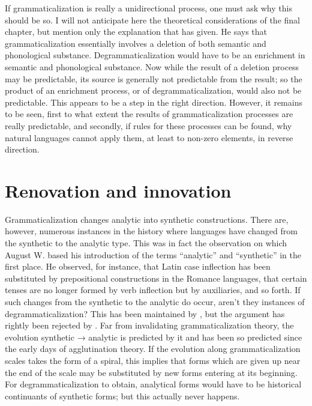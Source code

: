 \enlargethispage{2\baselineskip}
If grammaticalization is really a unidirectional process, one must ask why this should be so. I will not anticipate here the theoretical considerations of the final chapter, but mention only the explanation that \citet[96]{Givón1975} has given. He says that grammaticalization essentially involves a deletion of both semantic and phonological substance. Degrammaticalization would have to be an enrichment in semantic and phonological substance. Now while the result of a deletion process may be predictable, its source is generally not predictable from the result; so the product of an enrichment process, or of degrammaticalization, would also not be predictable. This appears to be a step in the right direction. However, it remains to be seen, first to what extent the results of grammaticalization processes are really predictable, and secondly, if rules for these processes can be found, why natural languages cannot apply them, at least to non-zero elements, in reverse direction.

\section{Renovation and innovation}

Grammaticalization changes analytic into synthetic constructions. There are, however, numerous instances in the history where languages have changed from the synthetic to the analytic type. This was in fact the observation on which August W. \citet[14--30]{Schlegel1818} based his introduction of the terms ``analytic'' and ``synthetic'' in the first place. He observed, for instance, that Latin case inflection has been substituted by prepositional constructions in the Romance languages, that certain tenses are no longer formed by verb inflection but by auxiliaries, and so forth. If such changes from the synthetic to the analytic do occur, aren't they instances of degrammaticalization? This has been maintained by \citet[223--225]{Lightfoot1979}, but the argument has rightly been rejected by \citet[75f]{HeineEtAl1984}. Far from invalidating grammaticalization theory, the evolution synthetic → analytic is predicted by it and has been so predicted since the early days of agglutination theory. If the evolution along grammaticalization scales takes the form of a spiral, this implies that forms which are given up near the end of the scale may be substituted by new forms entering at its beginning. For degrammaticalization to obtain, analytical forms would have to be historical continuants of synthetic forms; but this actually never happens.

